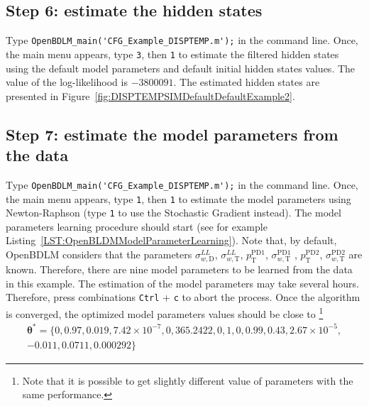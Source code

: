 \subsection{Step 6: estimate the hidden states}

Type \colorbox{light-gray}{\lstinline[basicstyle = \mlttfamily \small, backgroundcolor = \color{light-gray}]!OpenBDLM_main('CFG_Example_DISPTEMP.m');!} in the \MATLAB{} command line.
Once, the main menu appears, type  \colorbox{light-gray}{\lstinline[basicstyle = \mlttfamily \small, backgroundcolor = \color{light-gray}]!3!}, then \colorbox{light-gray}{\lstinline[basicstyle = \mlttfamily \small, backgroundcolor = \color{light-gray}]!1!} to estimate the filtered hidden states using the default model parameters and default initial hidden states values.
The value of the log-likelihood is $-3800091$.
The estimated hidden states are presented in Figure~\ref{fig:DISPTEMPSIMDefaultDefaultExample2}.


\subsection{Step 7: estimate the model parameters from the data}

Type \colorbox{light-gray}{\lstinline[basicstyle = \mlttfamily \small, backgroundcolor = \color{light-gray}]!OpenBDLM_main('CFG_Example_DISPTEMP.m');!} in the \MATLAB{} command line.
Once, the main menu appears, type  \colorbox{light-gray}{\lstinline[basicstyle = \mlttfamily \small, backgroundcolor = \color{light-gray}]!1!}, then \colorbox{light-gray}{\lstinline[basicstyle = \mlttfamily \small, backgroundcolor = \color{light-gray}]!1!} to estimate the model parameters using Newton-Raphson (type  \colorbox{light-gray}{\lstinline[basicstyle = \mlttfamily \small, backgroundcolor = \color{light-gray}]!1!} to use the Stochastic Gradient instead).
The model parameters learning procedure should start (see for example Listing~\ref{LST:OpenBLDMModelParameterLearning}).
Note that, by default, OpenBDLM considers that the parameters $\sigma_{w, \text{D}}^{LL}$, $\sigma_{w, \text{T}}^{LL}$, $p^{\text{PD1}}_{\text{T}}$, $\sigma_{w, \text{T}}^{\text{PD1}}$ , $p^{\text{PD2}}_{\text{T}}$, $\sigma_{w,\text{T}}^{\text{PD2}}$ are known.
Therefore, there are nine model parameters to be learned from the data in this example.
The estimation of the model parameters may take several hours.
Therefore, press combinations \colorbox{light-gray}{\lstinline[basicstyle = \mlttfamily \small, backgroundcolor = \color{light-gray}]!Ctrl!} + \colorbox{light-gray}{\lstinline[basicstyle = \mlttfamily \small, backgroundcolor = \color{light-gray}]!c!} to abort the process.
Once the algorithm is converged, the optimized model parameters values should be close to  \footnote{Note that it is possible to get slightly different value of parameters with the same performance.}
\begin{gather*}
 \bm\theta^{\text{*}}=\{0, 0.97, 0.019, 7.42\times10^{-7}, 0, 365.2422, 0, 1, 0, 0.99, 0.43, 2.67\times10^{-5},  \\
 -0.011, 0.0711, 0.000292 \}
\end{gather*}


